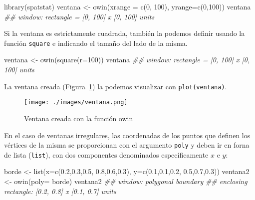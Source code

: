 \documentclass[
  letterpaper,
  DIV=11,
  numbers=noendperiod]{scrreprt}
\newenvironment{Shaded}{\begin{snugshade}}{\end{snugshade}}
\newcommand{\AttributeTok}[1]{\textcolor[rgb]{0.40,0.45,0.13}{#1}}
\newcommand{\DecValTok}[1]{\textcolor[rgb]{0.68,0.00,0.00}{#1}}
\newcommand{\DocumentationTok}[1]{\textcolor[rgb]{0.37,0.37,0.37}{\textit{#1}}}
\newcommand{\FloatTok}[1]{\textcolor[rgb]{0.68,0.00,0.00}{#1}}
\newcommand{\FunctionTok}[1]{\textcolor[rgb]{0.28,0.35,0.67}{#1}}
\newcommand{\NormalTok}[1]{\textcolor[rgb]{0.00,0.23,0.31}{#1}}
\newcommand{\OtherTok}[1]{\textcolor[rgb]{0.00,0.23,0.31}{#1}}
\begin{document}
\begin{Shaded}
\begin{Highlighting}[]
\FunctionTok{library}\NormalTok{(spatstat)}
\NormalTok{ventana }\OtherTok{\textless{}{-}} \FunctionTok{owin}\NormalTok{(}\AttributeTok{xrange =} \FunctionTok{c}\NormalTok{(}\DecValTok{0}\NormalTok{, }\DecValTok{100}\NormalTok{), }\AttributeTok{yrange=}\FunctionTok{c}\NormalTok{(}\DecValTok{0}\NormalTok{,}\DecValTok{100}\NormalTok{))}
\NormalTok{ventana}
\DocumentationTok{\#\# window: rectangle = [0, 100] x [0, 100] units}
\end{Highlighting}
\end{Shaded}

Si la ventana es estrictamente cuadrada, también la podemos definir
usando la función \texttt{square} e indicando el tamaño del lado de la
misma.

\begin{Shaded}
\begin{Highlighting}[]
\NormalTok{ventana }\OtherTok{\textless{}{-}} \FunctionTok{owin}\NormalTok{(}\FunctionTok{square}\NormalTok{(}\AttributeTok{r=}\DecValTok{100}\NormalTok{))}
\NormalTok{ventana}
\DocumentationTok{\#\# window: rectangle = [0, 100] x [0, 100] units}
\end{Highlighting}
\end{Shaded}

La ventana creada (Figura~\ref{fig-ventana}) la podemos visualizar con
\texttt{plot(ventana)}.

\begin{figure}

{\centering \texttt{[image: ./images/ventana.png]}

}

\caption{\label{fig-ventana}Ventana creada con la función owin}

\end{figure}

En el caso de ventanas irregulares, las coordenadas de los puntos que
definen los vértices de la misma se proporcionan con el argumento
\texttt{poly} y deben ir en forna de lista (\texttt{list}), con dos
componentes denominados específicamente \(x\) e \(y\):

\begin{Shaded}
\begin{Highlighting}[]
\NormalTok{borde }\OtherTok{\textless{}{-}} \FunctionTok{list}\NormalTok{(}\AttributeTok{x=}\FunctionTok{c}\NormalTok{(}\FloatTok{0.2}\NormalTok{,}\FloatTok{0.3}\NormalTok{,}\FloatTok{0.5}\NormalTok{, }\FloatTok{0.8}\NormalTok{,}\FloatTok{0.6}\NormalTok{,}\FloatTok{0.3}\NormalTok{),}
          \AttributeTok{y=}\FunctionTok{c}\NormalTok{(}\FloatTok{0.1}\NormalTok{,}\FloatTok{0.1}\NormalTok{,}\FloatTok{0.2}\NormalTok{, }\FloatTok{0.5}\NormalTok{,}\FloatTok{0.7}\NormalTok{,}\FloatTok{0.3}\NormalTok{))}
\NormalTok{ventana2 }\OtherTok{\textless{}{-}} \FunctionTok{owin}\NormalTok{(}\AttributeTok{poly=}\NormalTok{ borde)}
\NormalTok{ventana2}
\DocumentationTok{\#\# window: polygonal boundary}
\DocumentationTok{\#\# enclosing rectangle: [0.2, 0.8] x [0.1, 0.7] units}
\end{Highlighting}
\end{Shaded}
\end{document}
